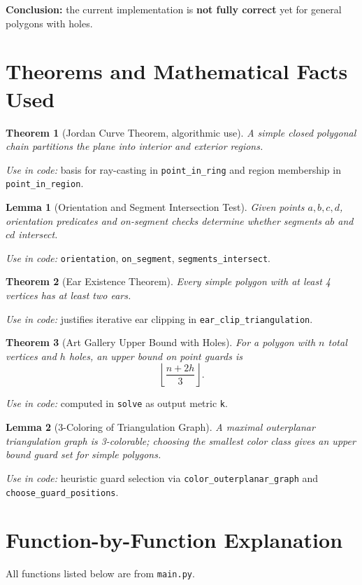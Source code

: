 \documentclass[11pt]{article}
\newtheorem{theorem}{Theorem}
\newtheorem{lemma}{Lemma}
\begin{document}
\textbf{Conclusion:} the current implementation is \textbf{not fully correct} yet for general polygons with holes.

\section{Theorems and Mathematical Facts Used}
\begin{theorem}[Jordan Curve Theorem, algorithmic use]
A simple closed polygonal chain partitions the plane into interior and exterior regions.
\end{theorem}
\textit{Use in code:} basis for ray-casting in \texttt{point\_in\_ring} and region membership in \texttt{point\_in\_region}.

\begin{lemma}[Orientation and Segment Intersection Test]
Given points $a,b,c,d$, orientation predicates and on-segment checks determine whether segments $ab$ and $cd$ intersect.
\end{lemma}
\textit{Use in code:} \texttt{orientation}, \texttt{on\_segment}, \texttt{segments\_intersect}.

\begin{theorem}[Ear Existence Theorem]
Every simple polygon with at least 4 vertices has at least two ears.
\end{theorem}
\textit{Use in code:} justifies iterative ear clipping in \texttt{ear\_clip\_triangulation}.

\begin{theorem}[Art Gallery Upper Bound with Holes]
For a polygon with $n$ total vertices and $h$ holes, an upper bound on point guards is
\[
\left\lfloor \frac{n + 2h}{3} \right\rfloor.
\]
\end{theorem}
\textit{Use in code:} computed in \texttt{solve} as output metric \texttt{k}.

\begin{lemma}[3-Coloring of Triangulation Graph]
A maximal outerplanar triangulation graph is 3-colorable; choosing the smallest color class gives an upper bound guard set for simple polygons.
\end{lemma}
\textit{Use in code:} heuristic guard selection via \texttt{color\_outerplanar\_graph} and \texttt{choose\_guard\_positions}.

\section{Function-by-Function Explanation}
All functions listed below are from \texttt{main.py}.
\end{document}
